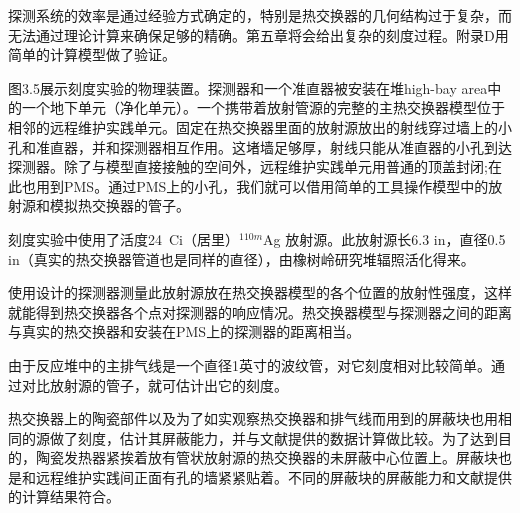 探测系统的效率是通过经验方式确定的，特别是热交换器的几何结构过于复杂，而无法通过理论计算来确保足够的精确。第五章将会给出复杂的刻度过程。附录D用简单的计算模型做了验证。

图3.5展示刻度实验的物理装置。探测器和一个准直器被安装在堆high-bay area中的一个地下单元（净化单元）。一个携带着放射管源的完整的主热交换器模型位于相邻的远程维护实践单元。固定在热交换器里面的放射源放出的射线穿过墙上的小孔和准直器，并和探测器相互作用。这堵墙足够厚，射线只能从准直器的小孔到达探测器。除了与模型直接接触的空间外，远程维护实践单元用普通的顶盖封闭;在此也用到PMS。通过PMS上的小孔，我们就可以借用简单的工具操作模型中的放射源和模拟热交换器的管子。

刻度实验中使用了活度24\ Ci（居里）$^{110m}$Ag 放射源。此放射源长6.3 in，直径0.5 in（真实的热交换器管道也是同样的直径），由橡树岭研究堆辐照活化得来。

使用设计的探测器测量此放射源放在热交换器模型的各个位置的放射性强度，这样就能得到热交换器各个点对探测器的响应情况。热交换器模型与探测器之间的距离与真实的热交换器和安装在PMS上的探测器的距离相当。

由于反应堆中的主排气线是一个直径1英寸的波纹管，对它刻度相对比较简单。通过对比放射源的管子，就可估计出它的刻度。

热交换器上的陶瓷部件以及为了如实观察热交换器和排气线而用到的屏蔽块也用相同的源做了刻度，估计其屏蔽能力，并与文献提供的数据计算做比较。为了达到目的，陶瓷发热器紧挨着放有管状放射源的热交换器的未屏蔽中心位置上。屏蔽块也是和远程维护实践间正面有孔的墙紧紧贴着。不同的屏蔽块的屏蔽能力和文献提供的计算结果符合。
